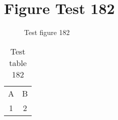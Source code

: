 \documentclass{article}
\begin{document}
\section{Figure Test 182}
\begin{figure}[h]
\caption{Test figure 182}
\end{figure}
\begin{table}[h]
\caption{Test table 182}
\begin{tabular}{cc}
A & B \\
1 & 2
\end{tabular}
\end{table}
\end{document}
